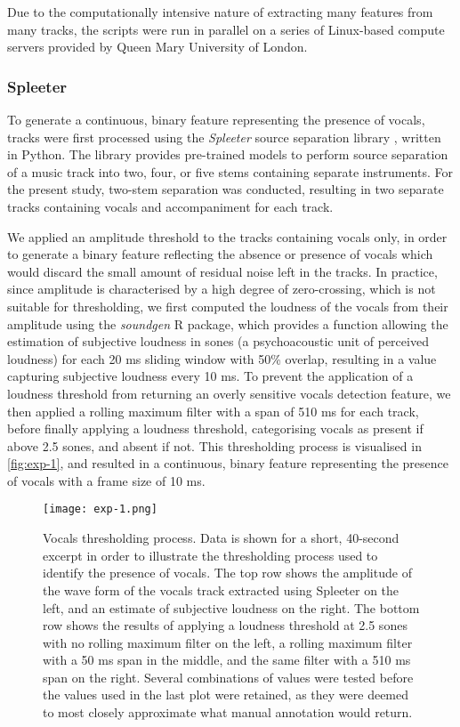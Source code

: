 Due to the computationally intensive nature of extracting many features from many tracks, the scripts were run in parallel on a series of Linux-based compute servers provided by Queen Mary University of London.

\subsubsection{Spleeter}

To generate a continuous, binary feature representing the presence of vocals, tracks were first processed using the \emph{Spleeter} source separation library \parencite{hennequin2020}, written in Python. The library provides pre-trained models to perform source separation of a music track into two, four, or five stems containing separate instruments. For the present study, two-stem separation was conducted, resulting in two separate tracks containing vocals and accompaniment for each track.

We applied an amplitude threshold to the tracks containing vocals only, in order to generate a binary feature reflecting the absence or presence of vocals which would discard the small amount of residual noise left in the tracks. In practice, since amplitude is characterised by a high degree of zero-crossing, which is not suitable for thresholding, we first computed the loudness of the vocals from their amplitude using the \emph{soundgen} R package, which provides a function allowing the estimation of subjective loudness in sones (a psychoacoustic unit of perceived loudness) for each 20 ms sliding window with 50\% overlap, resulting in a value capturing subjective loudness every 10 ms. To prevent the application of a loudness threshold from returning an overly sensitive vocals detection feature, we then applied a rolling maximum filter with a span of 510 ms for each track, before finally applying a loudness threshold, categorising vocals as present if above 2.5 sones, and absent if not. This thresholding process is visualised in \autoref{fig:exp-1}, and resulted in a continuous, binary feature representing the presence of vocals with a frame size of 10 ms.

\begin{figure}[t!]
\texttt{[image: exp-1.png]}
\centering
\caption{Vocals thresholding process. Data is shown for a short, 40-second excerpt in order to illustrate the thresholding process used to identify the presence of vocals. The top row shows the amplitude of the wave form of the vocals track extracted using Spleeter on the left, and an estimate of subjective loudness on the right. The bottom row shows the results of applying a loudness threshold at 2.5 sones with no rolling maximum filter on the left, a rolling maximum filter with a 50 ms span in the middle, and the same filter with a 510 ms span on the right. Several combinations of values were tested before the values used in the last plot were retained, as they were deemed to most closely approximate what manual annotation would return.}
\label{fig:exp-1}
\end{figure}

